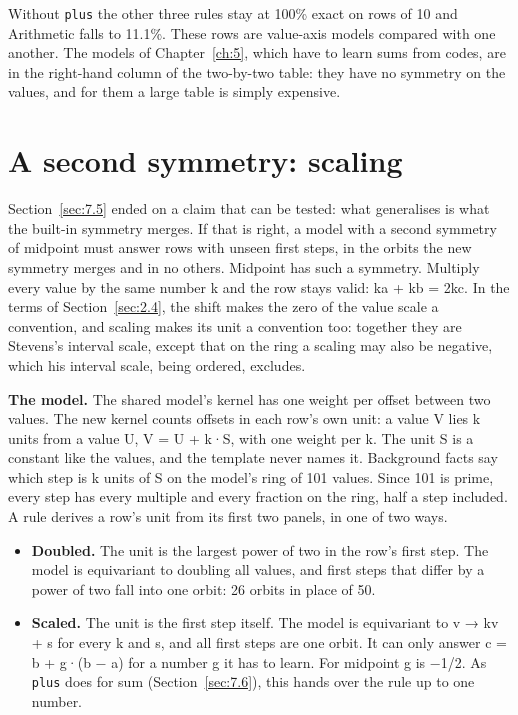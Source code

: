Without \texttt{plus} the other three rules stay at 100\% exact on rows of 10 and Arithmetic falls to 11.1\%. These rows are value-axis models compared with one another. The models of Chapter~\ref{ch:5}, which have to learn sums from codes, are in the right-hand column of the two-by-two table: they have no symmetry on the values, and for them a large table is simply expensive.

\section{A second symmetry: scaling}\label{sec:7.7}

Section~\ref{sec:7.5} ended on a claim that can be tested: what generalises is what the built-in symmetry merges. If that is right, a model with a second symmetry of midpoint must answer rows with unseen first steps, in the orbits the new symmetry merges and in no others. Midpoint has such a symmetry. Multiply every value by the same number k and the row stays valid: ka + kb = 2kc. In the terms of Section~\ref{sec:2.4}, the shift makes the zero of the value scale a convention, and scaling makes its unit a convention too: together they are Stevens's interval scale, except that on the ring a scaling may also be negative, which his interval scale, being ordered, excludes.

\textbf{The model.} The shared model's kernel has one weight per offset between two values. The new kernel counts offsets in each row's own unit: a value V lies k units from a value U, V = U + k·S, with one weight per k. The unit S is a constant like the values, and the template never names it. Background facts say which step is k units of S on the model's ring of 101 values. Since 101 is prime, every step has every multiple and every fraction on the ring, half a step included. A rule derives a row's unit from its first two panels, in one of two ways.

\begin{itemize}
\item \textbf{Doubled.} The unit is the largest power of two in the row's first step. The model is equivariant to doubling all values, and first steps that differ by a power of two fall into one orbit: 26 orbits in place of 50.
\item \textbf{Scaled.} The unit is the first step itself. The model is equivariant to v → kv + s for every k and s, and all first steps are one orbit. It can only answer c = b + g·(b − a) for a number g it has to learn. For midpoint g is −1/2. As \texttt{plus} does for sum (Section~\ref{sec:7.6}), this hands over the rule up to one number.
\end{itemize}

